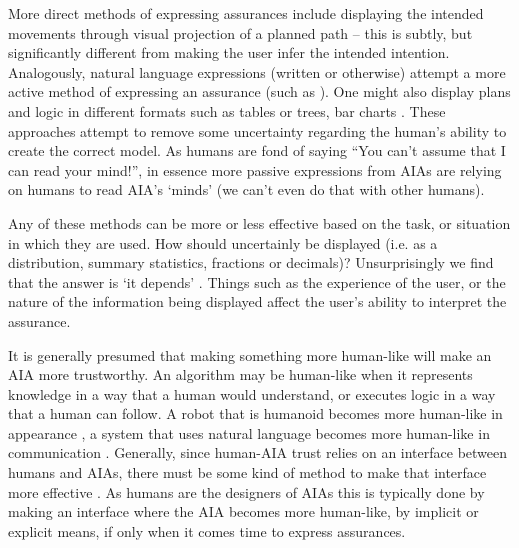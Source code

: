     More direct methods of expressing assurances include displaying the intended movements through visual projection of a planned path \cite{Chadalavada2015-wx} -- this is subtly, but significantly different from making the user infer the intended intention. Analogously, natural language expressions (written or otherwise) attempt a more active method of expressing an assurance (such as \cite{Wang2016-id}). One might also display plans and logic in different formats such as tables or trees, bar charts  \cite{Van_Belle2013-ph, Huysmans2011-th, Hutchins2015-if}. These approaches attempt to remove some uncertainty regarding the human's ability to create the correct model. As humans are fond of saying ``You can't assume that I can read your mind!'', in essence more passive expressions from AIAs are relying on humans to read AIA's `minds' (we can't even do that with other humans).

    Any of these methods can be more or less effective based on the task, or situation in which they are used. How should uncertainly be displayed (i.e. as a distribution, summary statistics, fractions or decimals)?  Unsurprisingly we find that the answer is `it depends' \cite{Chen2014-dk,Wallace2001-fm,Kuhn1997-qc,Lacave2002-cu}. Things such as the experience of the user, or the nature of the information being displayed affect the user's ability to interpret the assurance. 

    It is generally presumed that making something more human-like will make an AIA more trustworthy. An algorithm may be human-like when it represents knowledge in a way that a human would understand, or executes logic in a way that a human can follow. A robot that is humanoid becomes more human-like in appearance \cite{Bainbridge2011-pl}, a system that uses natural language becomes more human-like in communication \cite{Lacave2002-cu}. Generally, since human-AIA trust relies on an interface between humans and AIAs, there must be some kind of method to make that interface more effective . As humans are the designers of AIAs this is typically done by making an interface where the AIA becomes more human-like, by implicit or explicit means, if only when it comes time to express assurances. 

